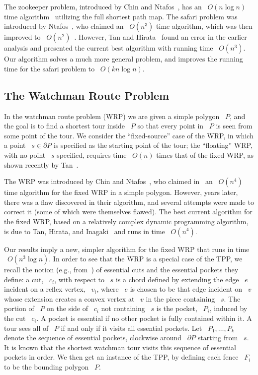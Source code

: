 \documentclass[11pt]{article}
\begin{document}
The zookeeper problem, introduced by Chin and Ntafos~\cite{ref8}, has an ~\(O(n\log n)\) time algorithm~\cite{ref3} utilizing the full shortest path map.
The safari problem was introduced by Ntafos~\cite{ref21}, who claimed an ~\(O(n^3)\) time algorithm, which was then improved to ~\(O(n^2)\)~\cite{ref24}.
However, Tan and Hirata~\cite{ref28} found an error in the earlier analysis and presented the current best algorithm with running time ~\(O(n^3)\).
Our algorithm solves a much more general problem, and improves the running time for the safari problem to ~\(O(kn\log n)\).

\subsection{The Watchman Route Problem}

In the watchman route problem (WRP) we are given a simple polygon ~\(P\), and the goal is to find a shortest tour inside ~\(P\) so that every point in ~\(P\) is seen from some point of the tour.
We consider the ``fixed-source'' case of the WRP, in which a point ~\(s \in \partial P\) is specified as the starting point of the tour; the ``floating'' WRP, with no point ~\(s\) specified, requires time ~\(O(n)\) times that of the fixed WRP, as shown recently by Tan~\cite{ref26}.

The WRP was introduced by Chin and Ntafos~\cite{ref9, ref7}, who claimed in~\cite{ref7} an ~\(O(n^4)\) time algorithm for the fixed WRP in a simple polygon.
However, years later, there was a flaw discovered in their algorithm, and several attempts were made to correct it (some of which were themselves flawed).
The best current algorithm for the fixed WRP, based on a relatively complex dynamic programming algorithm, is due to Tan, Hirata, and Inagaki~\cite{ref25} and runs in time ~\(O(n^4)\).

Our results imply a new, simpler algorithm for the fixed WRP that runs in time ~\(O(n^3\log n)\).
In order to see that the WRP is a special case of the TPP, we recall the notion (e.g., from~\cite{ref7}) of essential cuts and the essential pockets they define: a cut, ~\(c_i\), with respect to ~\(s\) is a chord defined by extending the edge ~\(e\) incident on a reflex vertex, ~\(v_i\), where ~\(e\) is chosen to be that edge incident on ~\(v\) whose extension creates a convex vertex at ~\(v\) in the piece containing ~\(s\).
The portion of ~\(P\) on the side of ~\(c_i\) not containing ~\(s\) is the pocket, ~\(P_i\), induced by the cut ~\(c_i\).
A pocket is essential if no other pocket is fully contained within it.
A tour sees all of ~\(P\) if and only if it visits all essential pockets.
Let ~\(P_1, \ldots, P_k\) denote the sequence of essential pockets, clockwise around ~\(\partial P\) starting from ~\(s\).
It is known that the shortest watchman tour visits this sequence of essential pockets in order.
We then get an instance of the TPP, by defining each fence ~\(F_i\) to be the bounding polygon ~\(P\).
\end{document}
